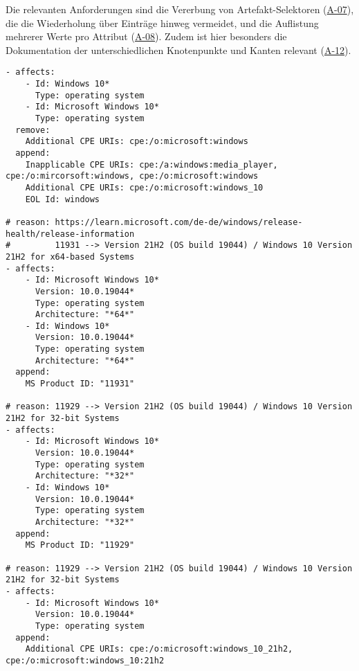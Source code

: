 Die relevanten Anforderungen sind die Vererbung von Artefakt-Selektoren (\hyperref[subsec:req-selektor-inheritance]{A-07}), die die Wiederholung über Einträge hinweg vermeidet, und die Auflistung mehrerer Werte pro Attribut (\hyperref[subsec:req-multiple-attribute-values]{A-08}).
Zudem ist hier besonders die Dokumentation der unterschiedlichen Knotenpunkte und Kanten relevant (\hyperref[subsec:req-reason-format]{A-12}).

\begin{lstlisting}[style=yaml,caption={Windows-Korrelation mit mehreren Identifikatoren},label={lst:reference-case-windows},basicstyle=\ttfamily\scriptsize]
- affects:
    - Id: Windows 10*
      Type: operating system
    - Id: Microsoft Windows 10*
      Type: operating system
  remove:
    Additional CPE URIs: cpe:/o:microsoft:windows
  append:
    Inapplicable CPE URIs: cpe:/a:windows:media_player, cpe:/o:mircorsoft:windows, cpe:/o:microsoft:windows
    Additional CPE URIs: cpe:/o:microsoft:windows_10
    EOL Id: windows

# reason: https://learn.microsoft.com/de-de/windows/release-health/release-information
#         11931 --> Version 21H2 (OS build 19044) / Windows 10 Version 21H2 for x64-based Systems
- affects:
    - Id: Microsoft Windows 10*
      Version: 10.0.19044*
      Type: operating system
      Architecture: "*64*"
    - Id: Windows 10*
      Version: 10.0.19044*
      Type: operating system
      Architecture: "*64*"
  append:
    MS Product ID: "11931"

# reason: 11929 --> Version 21H2 (OS build 19044) / Windows 10 Version 21H2 for 32-bit Systems
- affects:
    - Id: Microsoft Windows 10*
      Version: 10.0.19044*
      Type: operating system
      Architecture: "*32*"
    - Id: Windows 10*
      Version: 10.0.19044*
      Type: operating system
      Architecture: "*32*"
  append:
    MS Product ID: "11929"

# reason: 11929 --> Version 21H2 (OS build 19044) / Windows 10 Version 21H2 for 32-bit Systems
- affects:
    - Id: Microsoft Windows 10*
      Version: 10.0.19044*
      Type: operating system
  append:
    Additional CPE URIs: cpe:/o:microsoft:windows_10_21h2, cpe:/o:microsoft:windows_10:21h2
\end{lstlisting}
